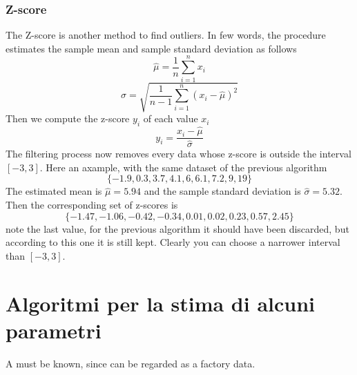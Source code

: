 \documentclass[12pt,twoside]{report}
\begin{document}
\subsection{Z-score}
The Z-score is another method to find outliers. In few words, the procedure estimates the sample mean and sample standard deviation as follows
\begin{equation}
    \hat{\mu}=\frac{1}{n}\sum_{i=1}^nx_i
\end{equation}
\begin{equation}
    \hat{\sigma}=\sqrt{\frac{1}{n-1}\sum_{i=1}^n(x_i-\hat{\mu})^2}
\end{equation}
Then we compute the z-score $y_i$ of each value $x_i$
\begin{equation}
    y_i=\frac{x_i-\hat{\mu}}{\hat{\sigma}}
\end{equation}
The filtering process now removes every data whose z-score is outside the interval $[-3,3]$. Here an axample, with the same dataset of the previous algorithm
$$\{-1.9, 0.3, 3.7, 4.1, 6, 6.1, 7.2, 9, 19\}$$
The estimated mean is $\hat{\mu}=5.94$ and the sample standard deviation is $\hat{\sigma}=5.32$. Then the corresponding set of z-scores is
$$\{-1.47, -1.06, -0.42, -0.34, 0.01, 0.02, 0.23, 0.57, 2.45\}$$
note the last value, for the previous algorithm it should have been discarded, but according to this one it is still kept. Clearly you can choose a narrower interval than $[-3,3]$.

\clearpage

\chapter{Algoritmi per la stima di alcuni parametri}
A must be known, since can be regarded as a factory data.
\end{document}
